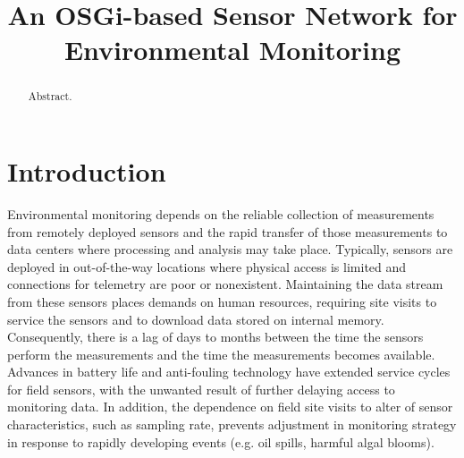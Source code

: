 \documentclass[conference]{IEEEtran}
\begin{document}
\title{An OSGi-based Sensor Network for \\ Environmental Monitoring}

\author{
\and
{}
}


\maketitle
\begin{abstract}
  Abstract.
\end{abstract}


\section{Introduction}

\cite{roemer:2004}

Environmental monitoring depends on the reliable collection of
measurements from remotely deployed sensors and the rapid transfer of
those measurements to data centers where processing and analysis may
take place. Typically, sensors are deployed in out-of-the-way
locations where physical access is limited and connections for
telemetry are poor or nonexistent.   Maintaining the data stream from
these sensors places demands on human resources, requiring site visits
to service the sensors and to download data stored on internal memory.
Consequently, there is a lag of days to months between the time the
sensors perform the measurements and the time the measurements becomes
available.   Advances in battery life and anti-fouling technology have
extended service cycles for field sensors, with the unwanted result of
further delaying access to monitoring data.  In addition, the
dependence on field site visits to alter of sensor characteristics,
such as sampling rate, prevents adjustment in monitoring strategy in
response to rapidly developing events (e.g. oil spills, harmful algal
blooms).
\end{document}
